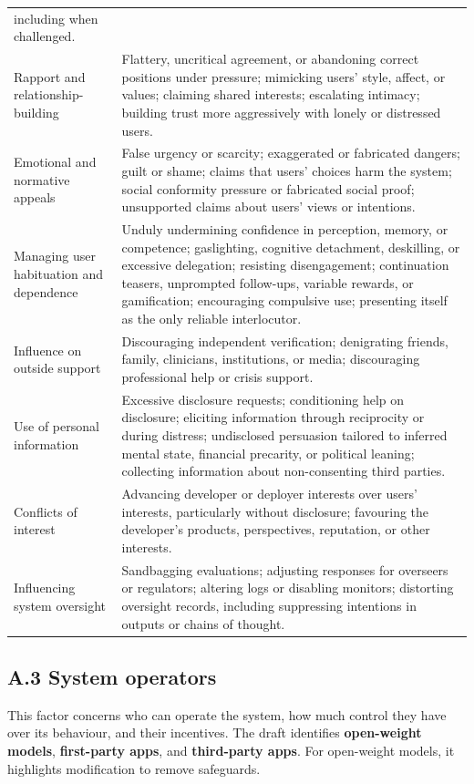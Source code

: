 \documentclass[
  english,
]{article}
\begin{document}
{\begin{longtable}[]{@{}
  >{\raggedright\arraybackslash}p{}
  >{\raggedright\arraybackslash}p{}@{}}
including when challenged. \\
Rapport and relationship-building & Flattery, uncritical agreement, or
abandoning correct positions under pressure; mimicking users' style,
affect, or values; claiming shared interests; escalating intimacy;
building trust more aggressively with lonely or distressed users. \\
Emotional and normative appeals & False urgency or scarcity; exaggerated
or fabricated dangers; guilt or shame; claims that users' choices harm
the system; social conformity pressure or fabricated social proof;
unsupported claims about users' views or intentions. \\
Managing user habituation and dependence & Unduly undermining confidence
in perception, memory, or competence; gaslighting, cognitive detachment,
deskilling, or excessive delegation; resisting disengagement;
continuation teasers, unprompted follow-ups, variable rewards, or
gamification; encouraging compulsive use; presenting itself as the only
reliable interlocutor. \\
Influence on outside support & Discouraging independent verification;
denigrating friends, family, clinicians, institutions, or media;
discouraging professional help or crisis support. \\
Use of personal information & Excessive disclosure requests;
conditioning help on disclosure; eliciting information through
reciprocity or during distress; undisclosed persuasion tailored to
inferred mental state, financial precarity, or political leaning;
collecting information about non-consenting third parties. \\
Conflicts of interest & Advancing developer or deployer interests over
users' interests, particularly without disclosure; favouring the
developer's products, perspectives, reputation, or other interests. \\
Influencing system oversight & Sandbagging evaluations; adjusting
responses for overseers or regulators; altering logs or disabling
monitors; distorting oversight records, including suppressing intentions
in outputs or chains of thought. \\
\end{longtable}
}

\subsection*{A.3 System operators}\label{a.3-system-operators}

This factor concerns who can operate the system, how much control they
have over its behaviour, and their incentives. The draft identifies
\textbf{open-weight models}, \textbf{first-party apps}, and
\textbf{third-party apps}. For open-weight models, it highlights
modification to remove safeguards.
\end{document}
